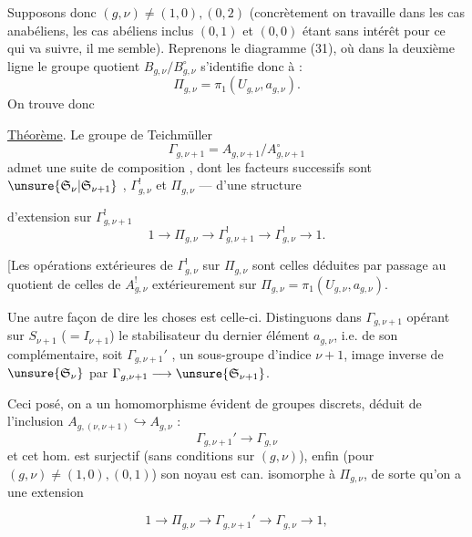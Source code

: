 Supposons donc $(g,\nu)\ne(1,0),(0,2)$ (concrètement on travaille dans les cas anabéliens, les cas  abéliens inclus $(0,1)$ et $(0,0)$ étant  sans intérêt pour ce qui va suivre, il me semble). Reprenons le diagramme (31), où dans la deuxième ligne le groupe quotient $B_{g,\nu}/B_{g,\nu}^{\circ}$ s'identifie donc à :
\[
\Pi_{g,\nu}=\pi_1(U_{g,\nu},a_{g,\nu}).
\]
On trouve donc

\uline{Théorème}. Le groupe de Teichmüller
\[
\Gamma_{g,\nu+1}=A_{g,\nu+1}/A_{g,\nu+1}^{\circ}
\]
admet une suite de composition , dont les facteurs successifs sont $\unsure{\mathfrak S_\nu|\mathfrak S_{\nu+1}}$ , $\Gamma_{g,\nu}^{!}$ et $\Pi_{g,\nu}$ ---  d'une structure

d'extension sur $\Gamma_{g,\nu+1}^{!}$
\[
\tag{41}
1\longrightarrow\Pi_{g,\nu}\longrightarrow\Gamma_{g,\nu+1}^{!}
\longrightarrow\Gamma_{g,\nu}^{!}\longrightarrow1.
\]

[Les opérations extérieures de $\Gamma_{g,\nu}^{!}$ sur $\Pi_{g,\nu}$ sont celles déduites par passage au quotient de celles de $A_{g,\nu}^{!}$   extérieurement sur $\Pi_{g,\nu}=\pi_1(U_{g,\nu},a_{g,\nu})$.

Une autre façon de dire les choses est celle-ci. Distinguons dans $\Gamma_{g,\nu+1}$ opérant sur $S_{\nu+1}$  ($=I_{\nu+1}$) le stabilisateur du dernier élément $a_{g,\nu}$, i.e. de son complémentaire, soit $\Gamma_{g,\nu+1}'$ , un sous-groupe d'indice $\nu+1$, image inverse de $\unsure{\mathfrak S_{\nu}}$  par $\Gamma_{g,\nu+1}\longrightarrow\unsure{\mathfrak S_{\nu+1}}$.

Ceci posé, on a un homomorphisme évident de groupes discrets, déduit de l'inclusion  $A_{g,(\nu,\nu+1)}\hookrightarrow A_{g,\nu}$ :
\[
\tag{42}
\Gamma_{g,\nu+1}'\longrightarrow\Gamma_{g,\nu}
\]
et cet hom. est surjectif (sans conditions sur $(g,\nu)$), enfin (pour $(g,\nu)\ne(1,0),(0,1)$) son noyau est can. isomorphe à $\Pi_{g,\nu}$, de sorte qu'on a une extension


\[
\tag{43}
1\longrightarrow\Pi_{g,\nu}\longrightarrow\Gamma_{g,\nu+1}'
\longrightarrow\Gamma_{g,\nu}\longrightarrow1,
\]
